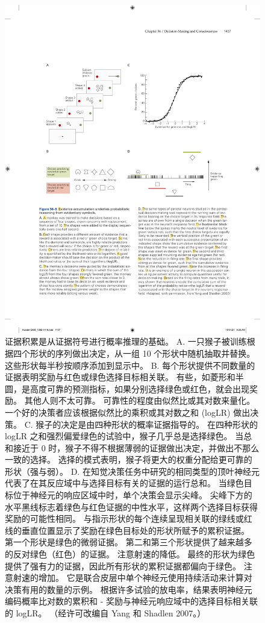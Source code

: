 \begin{figure}[htbp]
	\centering
	\includegraphics[width=0.85\linewidth]{chap56/fig_56_9}
	\caption{证据积累是从证据符号进行概率推理的基础。 A. 一只猴子被训练根据四个形状的序列做出决定，从一组 10 个形状中随机抽取并替换。这些形状每半秒按顺序添加到显示中。 B. 每个形状提供不同数量的证据表明奖励与红色或绿色选择目标相关联。 有些，如菱形和半圆，是高度可靠的预测指标，如果分别选择绿色或红色，就会出现奖励。 其他人则不太可靠。 可靠性的程度由似然比或其对数来量化。 一个好的决策者应该根据似然比的乘积或其对数之和 (logLR) 做出决策。 C. 猴子的决定是由四种形状的概率证据指导的。 在四种形状的 logLR 之和强烈偏爱绿色的试验中，猴子几乎总是选择绿色。 当总和接近于 0 时，猴子不得不根据薄弱的证据做出决定，并做出不那么一致的选择。 选择的模式表明，猴子将更大的权重分配给更可靠的形状（强与弱）。 D. 在知觉决策任务中研究的相同类型的顶叶神经元代表了在其反应域中与选择目标有关的证据的运行总和。 当绿色目标位于神经元的响应区域中时，单个决策会显示尖峰。 尖峰下方的水平黑线标志着绿色与红色证据的中性水平，这样两个选择目标获得奖励的可能性相同。 与指示形状的每个连续呈现相关联的绿线或红线的垂直位置显示了奖励在绿色目标处的形状所赋予的累积证据。 第一个形状是绿色的微弱证据。 第二和第三个形状提供了越来越多的反对绿色（红色）的证据。 注意射速的降低。 最终的形状为绿色提供了强有力的证据，因此所有形状的累积证据都偏向于绿色。 注意射速的增加。 它是联合皮层中单个神经元使用持续活动来计算对决策有用的数量的示例。 根据许多试验的放电率，结果表明神经元编码概率比对数的累积和 - 奖励与神经元响应域中的选择目标相关联的 logLR。 （经许可改编自 Yang 和 Shadlen 2007。）}
	\label{fig:56_9}
\end{figure}

